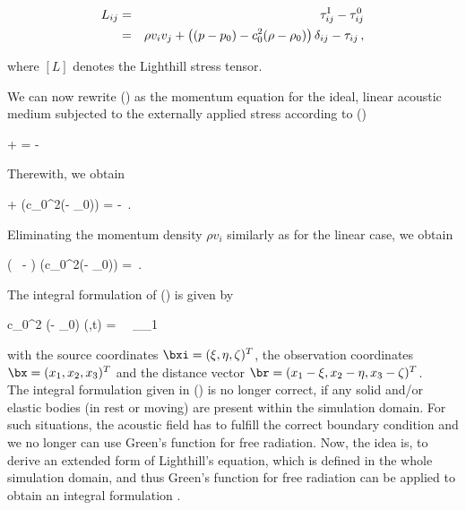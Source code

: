 \documentclass[a4paper,10pt]{article}
\begin{document}
\begin{eqnarray}
\label{eq:Lt1}
L_{ij} &=& \tau^{\rm I}_{ij} - \tau_{ij}^0 \nonumber \\
&=& \rho v_i v_j + \left( (p-p_0) - c_0^2 (\rho - \rho_0)\right) \delta_{ij} - \tau_{ij}\,,
\end{eqnarray}

\noindent
where $[L]$ denotes the {Lighthill stress tensor}.

We can  now rewrite  () as the  momentum equation  for the
ideal, linear  acoustic medium subjected to the  externally applied stress
according to ()

 +  =
- 
\ee

\noindent
Therewith, we obtain

 +  \left(c_0^2(\rho - \rho_0)\right)
= - \,.
\ee

\noindent
Eliminating the  momentum density $\rho  v_i$ similarly as for  the linear
case, we obtain

\left(  \,   -  \right) (c_0^2(\rho - \rho_0)) 
= \,.
\ee

\noindent
The integral formulation of () is given by

c_0^2 (\rho - \rho_0) (\bx,t) =  \, 
\, \int\limits_{\Omega_1}\, \, \rd\xi \rd\eta \rd\zeta
\ee

\noindent
with the source coordinates $\bxi = (\xi, \eta, \zeta)^T$, the observation
coordinates  $\bx =  (x_1,x_2,  x_3)^T$  and the  distance  vector $\br  =
(x_1-\xi, x_2-\eta, x_3-\zeta)^T$.\\

The integral formulation given in () is no longer correct, if any
solid and/or  elastic bodies  (in rest or  moving) are present  within the
simulation domain. For such situations,  the acoustic field has to fulfill
the correct boundary  condition and we no longer  can use Green's function
for  free radiation.   Now, the  idea is,  to derive  an extended  form of
Lighthill's equation, which is defined in the whole simulation domain, and
thus  Green's function  for free  radiation can  be applied  to  obtain an
integral formulation \cite{Ffowcs-Williams1969}.
\end{document}
